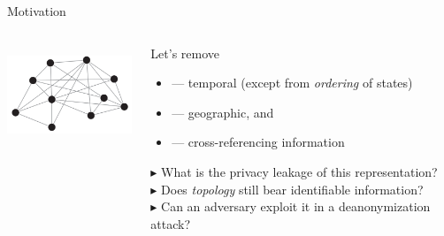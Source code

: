 \documentclass[hyperref={colorlinks = true},unknownkeysallowed]{beamer}
\begin{document}
\begin{frame}{Motivation}
	\begin{columns}
		\begin{column}[t]{0.35\textwidth}
			\begin{center}
				\centering	\includegraphics[width=4cm,height=3cm]{figs/mobility_network.png}\\[.5\baselineskip]
			\end{center}
			\begin{center}
			\end{center}
		\end{column}
		\begin{column}[t]{0.65\textwidth}
			\begin{block}{Let's remove}
				\begin{itemize}
					\item --- temporal (except from \emph{ordering} of states)
					\item --- geographic, and
					\item --- cross-referencing information
				\end{itemize}
			\end{block}
			\begin{block}{$\blacktriangleright$ What is the privacy leakage of this representation? \\ 
					$\blacktriangleright$ Does \emph{topology} still bear identifiable information? \\
					$\blacktriangleright$ Can an adversary exploit it in a deanonymization attack? }
			\end{block}
		\end{column}
	\end{columns}
\end{frame}
\end{document}
